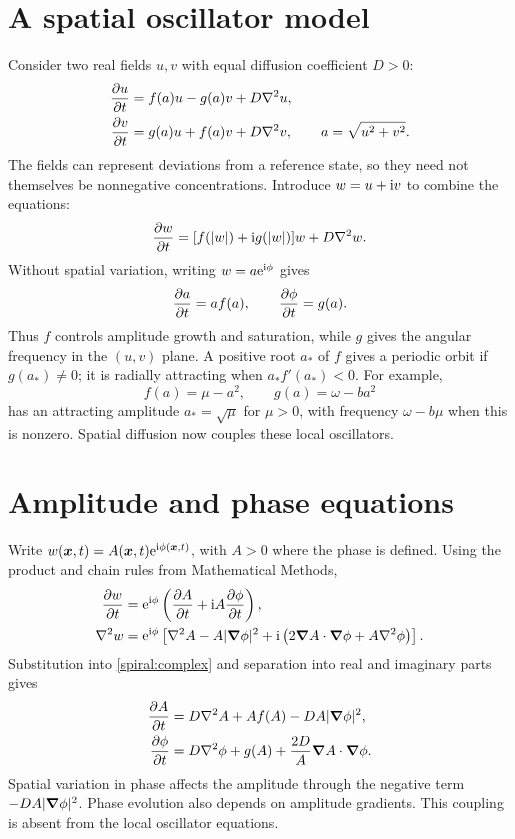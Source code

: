 \documentclass[main.tex]{subfiles}
\begin{document}
\section{A spatial oscillator model}\label{spiral:fg}
Consider two real fields $u,v$ with equal diffusion coefficient $D>0$:
\begin{align}
\pd{u}{t}&=f(a)u-g(a)v+D\nabla^2u,\\
\pd{v}{t}&=g(a)u+f(a)v+D\nabla^2v,\qquad a=\sqrt{u^2+v^2}.
\end{align}
The fields can represent deviations from a reference state, so they need not themselves be nonnegative concentrations. Introduce $w=u+\mathrm{i} v$ to combine the equations:
\begin{equation}\label{spiral:complex}
\pd{w}{t}=[f(|w|)+\i g(|w|)]w+D\nabla^2w.
\end{equation}
Without spatial variation, writing $w=a\mathrm{e}^{\mathrm{i}\phi}$ gives
\[
\pd{a}{t}=af(a),\qquad \pd{\phi}{t}=g(a).
\]
Thus $f$ controls amplitude growth and saturation, while $g$ gives the angular frequency in the $(u,v)$ plane. A positive root $a_*$ of $f$ gives a periodic orbit if $g(a_*)\ne0$; it is radially attracting when $a_*f'(a_*)<0$. For example,
\[
f(a)=\mu-a^2,\qquad g(a)=\omega-ba^2
\]
has an attracting amplitude $a_*=\sqrt\mu$ for $\mu>0$, with frequency $\omega-b\mu$ when this is nonzero. Spatial diffusion now couples these local oscillators.

\section{Amplitude and phase equations}\label{spiral:amplitudephase}
Write $w(\v{x},t)=A(\v{x},t)\e^{\i\phi(\v{x},t)}$, with $A>0$ where the phase is defined. Using the product and chain rules from Mathematical Methods,
\begin{align*}
\pd{w}{t}&=\e^{\i\phi}\left(\pd{A}{t}+\i A\pd{\phi}{t}\right),\\
\nabla^2w&=\e^{\i\phi}\left[\nabla^2A-A|\vnabla\phi|^2
+\i\left(2\vnabla A\cdot\vnabla\phi+A\nabla^2\phi\right)\right].
\end{align*}
Substitution into \cref{spiral:complex} and separation into real and imaginary parts gives
\begin{align}
\pd{A}{t}&=D\nabla^2A+Af(A)-DA|\vnabla\phi|^2,\label{spiral:A}\\
\pd{\phi}{t}&=D\nabla^2\phi+g(A)+\frac{2D}{A}\vnabla A\cdot\vnabla\phi.\label{spiral:phase}
\end{align}
Spatial variation in phase affects the amplitude through the negative term $-DA|\bm{\nabla}\phi|^2$. Phase evolution also depends on amplitude gradients. This coupling is absent from the local oscillator equations.
\end{document}
